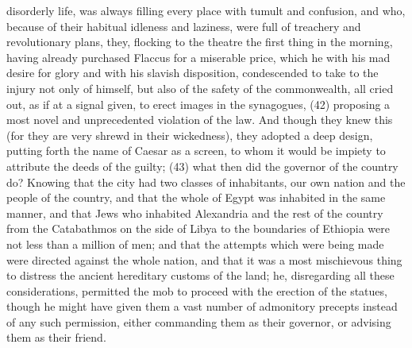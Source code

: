 disorderly life, was always filling every place with tumult and confusion, and who, because of their
habitual idleness and laziness, were full of treachery and revolutionary plans, they, flocking to the
theatre the first thing in the morning, having already purchased Flaccus for a miserable price,
which he with his mad desire for glory and with his slavish disposition, condescended to take to the
injury not only of himself, but also of the safety of the commonwealth, all cried out, as if at a signal
given, to erect images in the synagogues, (42) proposing a most novel and unprecedented
violation of the law. And though they knew this (for they are very shrewd in their wickedness), they
adopted a deep design, putting forth the name of Caesar as a screen, to whom it would be impiety
to attribute the deeds of the guilty; (43) what then did the governor of the country do? Knowing that
the city had two classes of inhabitants, our own nation and the people of the country, and that the
whole of Egypt was inhabited in the same manner, and that Jews who inhabited Alexandria and the
rest of the country from the Catabathmos on the side of Libya to the boundaries of Ethiopia were
not less than a million of men; and that the attempts which were being made were directed against
the whole nation, and that it was a most mischievous thing to distress the ancient hereditary
customs of the land; he, disregarding all these considerations, permitted the mob to proceed with
the erection of the statues, though he might have given them a vast number of admonitory
precepts instead of any such permission, either commanding them as their governor, or advising
them as their friend.

